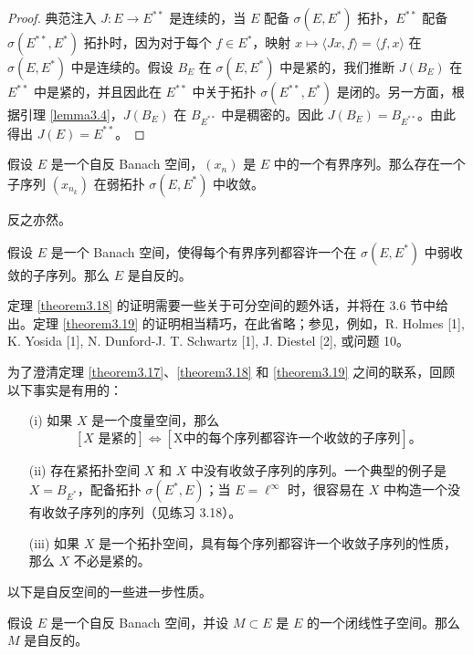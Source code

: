 \begin{proof}
典范注入 $J: E \to E^{**}$ 是连续的，当 $E$ 配备 $\sigma(E, E^*)$ 拓扑，$E^{**}$ 配备 $\sigma(E^{**}, E^*)$ 拓扑时，因为对于每个 $f \in E^*$，映射 $x \mapsto \langle Jx, f \rangle = \langle f, x \rangle$ 在 $\sigma(E, E^*)$ 中是连续的。假设 $B_E$ 在 $\sigma(E, E^*)$ 中是紧的，我们推断 $J(B_E)$ 在 $E^{**}$ 中是紧的，并且因此在 $E^{**}$ 中关于拓扑 $\sigma(E^{**}, E^*)$ 是闭的。另一方面，根据引理 \ref{lemma3.4}，$J(B_E)$ 在 $B_{E^{**}}$ 中是稠密的。因此 $J(B_E) = B_{E^{**}}$。由此得出 $J(E) = E^{**}$。
\end{proof}

\begin{theorem}\label{theorem3.18}
假设 $E$ 是一个自反 Banach 空间，$(x_n)$ 是 $E$ 中的一个有界序列。那么存在一个子序列 $(x_{n_k})$ 在弱拓扑 $\sigma(E, E^*)$ 中收敛。
\end{theorem}

反之亦然。

\begin{theorem}\label{theorem3.19}
假设 $E$ 是一个 Banach 空间，使得每个有界序列都容许一个在 $\sigma(E, E^*)$ 中弱收敛的子序列。那么 $E$ 是自反的。
\end{theorem}

定理 \ref{theorem3.18} 的证明需要一些关于可分空间的题外话，并将在 3.6 节中给出。定理 \ref{theorem3.19} 的证明相当精巧，在此省略；参见，例如，R. Holmes [1], K. Yosida [1], N. Dunford-J. T. Schwartz [1], J. Diestel [2], 或问题 10。

\begin{remark}\label{remark3.17}
为了澄清定理 \ref{theorem3.17}、\ref{theorem3.18} 和 \ref{theorem3.19} 之间的联系，回顾以下事实是有用的：
\begin{itemize}
    \item[(i)] 如果 $X$ 是一个度量空间，那么
    \[ [X \text{ 是紧的}] \iff [\text{X中的每个序列都容许一个收敛的子序列}]。 \]
    \item[(ii)] 存在紧拓扑空间 $X$ 和 $X$ 中没有收敛子序列的序列。一个典型的例子是 $X = B_{E^*}$，配备拓扑 $\sigma(E^*, E)$；当 $E = \ell^\infty$ 时，很容易在 $X$ 中构造一个没有收敛子序列的序列（见练习 3.18）。
    \item[(iii)] 如果 $X$ 是一个拓扑空间，具有每个序列都容许一个收敛子序列的性质，那么 $X$ 不必是紧的。
\end{itemize}
以下是自反空间的一些进一步性质。
\end{remark}

\begin{proposition}\label{prop3.20}
假设 $E$ 是一个自反 Banach 空间，并设 $M \subset E$ 是 $E$ 的一个闭线性子空间。那么 $M$ 是自反的。
\end{proposition}

